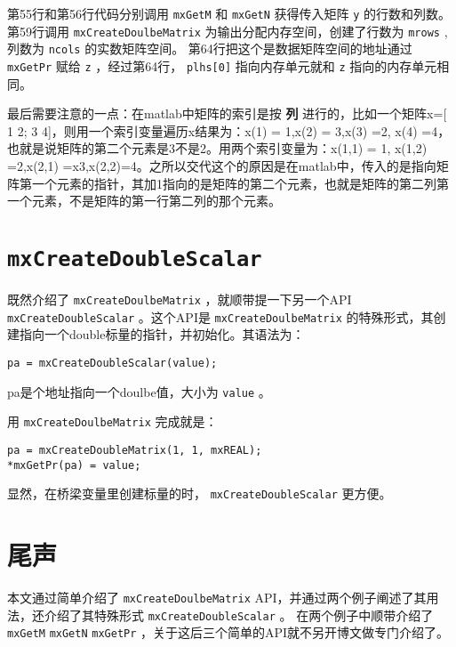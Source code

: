 \documentclass[10pt,a4paper,UTF8]{article}
\begin{document}
第55行和第56行代码分别调用 \texttt{mxGetM} 和 \texttt{mxGetN} 获得传入矩阵 \texttt{y} 的行数和列数。第59行调用 \texttt{mxCreateDoulbeMatrix} 为输出分配内存空间，创建了行数为 \texttt{mrows} ,列数为 \texttt{ncols} 的实数矩阵空间。 第64行把这个是数据矩阵空间的地址通过 \texttt{mxGetPr} 赋给 \texttt{z} ，经过第64行， \texttt{plhs[0]} 指向内存单元就和 \texttt{z} 指向的内存单元相同。

最后需要注意的一点：在matlab中矩阵的索引是按 \textbf{列} 进行的，比如一个矩阵x=[ 1 2; 3 4]，则用一个索引变量遍历x结果为：x(1) = 1,x(2) = 3,x(3) =2, x(4) =4，也就是说矩阵的第二个元素是3不是2。用两个索引变量为：x(1,1) = 1, x(1,2) =2,x(2,1) =x3,x(2,2)=4。之所以交代这个的原因是在matlab中，传入的是指向矩阵第一个元素的指针，其加1指向的是矩阵的第二个元素，也就是矩阵的第二列第一个元素，不是矩阵的第一行第二列的那个元素。

\section{\texttt{mxCreateDoubleScalar}}
\label{sec:orgheadline7}


既然介绍了 \texttt{mxCreateDoulbeMatrix}  ，就顺带提一下另一个API \texttt{mxCreateDoubleScalar} 。这个API是 \texttt{mxCreateDoulbeMatrix} 的特殊形式，其创建指向一个double标量的指针，并初始化。其语法为：
\lstset{language=C,label= ,caption= ,captionpos=b,numbers=none}
\begin{lstlisting}
pa = mxCreateDoubleScalar(value);
\end{lstlisting}
pa是个地址指向一个doulbe值，大小为 \texttt{value} 。

用 \texttt{mxCreateDoulbeMatrix} 完成就是：
\lstset{language=C,label= ,caption= ,captionpos=b,numbers=none}
\begin{lstlisting}
pa = mxCreateDoubleMatrix(1, 1, mxREAL);
*mxGetPr(pa) = value;
\end{lstlisting}

显然，在桥梁变量里创建标量的时， \texttt{mxCreateDoubleScalar} 更方便。
\section{尾声}
\label{sec:orgheadline8}


本文通过简单介绍了 \texttt{mxCreateDoulbeMatrix} API，并通过两个例子阐述了其用法，还介绍了其特殊形式 \texttt{mxCreateDoubleScalar} 。 在两个例子中顺带介绍了 \texttt{mxGetM} \texttt{mxGetN} \texttt{mxGetPr} ，关于这后三个简单的API就不另开博文做专门介绍了。
\end{document}
